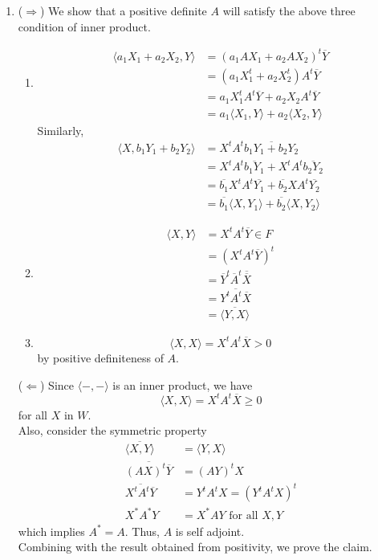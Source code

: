 \documentclass[12pt]{article}
\newcommand{\str}{^\ast}
\theoremstyle{definition}
\begin{document}
\begin{enumerate}
\begin{enumerate}
\item ($\Rightarrow$) We show that a positive definite $A$ will satisfy the above three condition of inner product.
\begin{enumerate}
  \item \begin{align*}
  \langle a_1X_1+a_2X_2,Y\rangle &=(a_1AX_1+a_2AX_2)^t\overline{Y}\\
  &=(a_1X_1^t+a_2X_2^t)A^t\overline{Y}\\
  &=a_1X_1^tA^t\overline{Y}+a_2X_2A^t\overline{Y}\\
  &=a_1\langle X_1,Y\rangle +a_2\langle X_2,Y\rangle
  \end{align*}
  Similarly, \begin{align*}
  \langle X,b_1Y_1+b_2Y_2\rangle &=X^tA^t\overline{b_1Y_1+b_2Y_2}\\
  &=X^tA^t\overline{b_1Y_1}+X^tA^t\overline{b_2Y_2}\\
  &=\overline{b_1}X^tA^t\overline{Y_1}+\overline{b_2}XA^t\overline{Y_2}\\
  &=\overline{b_1}\langle X,Y_1\rangle +\overline{b_2}\langle X,Y_2\rangle
  \end{align*}
  \item \begin{align*}\langle X,Y\rangle&=X^tA^t\overline{Y}\in F\\
  &=(X^tA^t\overline{Y})^t\\
  &=\overline{Y}^t\overline{A}^t\overline{\overline{X}}\\
  &=\overline{Y^tA^t\overline{X}}\\
  &=\overline{\langle Y, X\rangle}
  \end{align*}
  \item \[
  \langle X,X\rangle=X^tA^t\overline{X}>0
  \]by positive definiteness of $A$.
\end{enumerate}
($\Leftarrow$) Since $\langle - , -\rangle$ is an inner product, we have
\[
\langle X,X\rangle = X^tA^t\overline{X}\geq 0
\]
for all $X$ in $W$. \\
Also, consider the symmetric property
\begin{align*}
\overline{\langle X,Y\rangle} &= \langle Y,X \rangle\\
\overline{(AX)^t\overline{Y}}&= (AY)^tX\\
\overline{X^tA^t\overline{Y}} &=Y^tA^tX=(Y^tA^tX)^t\\
X\str A\str Y &= X\str AY\text{ for all } X,Y 
\end{align*}
which implies $A\str = A$. Thus, $A$ is self adjoint.\\Combining with the result obtained from positivity, we prove the claim.
\end{enumerate}

\end{enumerate}
\end{document}
